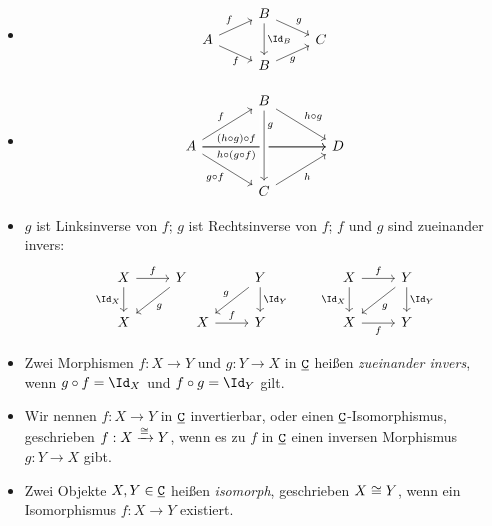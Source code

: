 \begin{ex}
	\begin{itemize}
		\item
			\[
				\begin{tikzcd}[row sep=tiny]
					& B \arrow{dr}{g} \arrow{dd}{\Id_B} & \\
					A \arrow{ur}{f} \arrow{dr}[below]{f} & & C \\
					& B \arrow{ur}[below]{g} &
				\end{tikzcd}
			\]
		\item
			\[
				\begin{tikzcd}[column sep=large]
					~& B \arrow{dr}{h\circ g} & \\
					A \arrow{ur}{f} \arrow{rr}[xshift=-7mm]{(h\circ g) \circ f}\arrow{rr}[xshift=-7mm,swap]{h\circ (g \circ f)} \arrow{dr}[swap]{g\circ f} & & D \\
					& C \arrow[leftarrow,crossing over]{uu}[yshift=5mm,swap]{g} \arrow{ur}[swap]{h} &
				\end{tikzcd}
			\]
		\item
			$g$ ist Linksinverse von $f$; $g$ ist Rechtsinverse von $f$; $f$ und $g$ sind zueinander invers:
			\[
				\begin{tikzcd}
					X \arrow{d}[swap]{\Id_X} \arrow{r}{f} & Y \arrow{dl}{g} \\
					X &
				\end{tikzcd}
				\!
				\begin{tikzcd}
					~& Y \arrow{d}{\Id_Y} \arrow{dl}[swap]{g} \\
					X \arrow{r}{f} & Y
				\end{tikzcd}
				\qquad
				\begin{tikzcd}
					X \arrow{r}{f} \arrow{d}[left]{\Id_X} & Y \arrow{d}{\Id_Y} \arrow{dl}{g} \\
					X \arrow{r}[below]{f} & Y
				\end{tikzcd}
			\]
	\end{itemize}
\end{ex}

\begin{df}
	\begin{itemize}
		\item
			Zwei Morphismen $f: X \to Y$ und $g: Y \to X$ in $\underline{\smash{\mathtt{C}}}$ heißen \emph{zueinander invers}, wenn $g \circ f = \Id_X$ und $f \circ g = \Id_Y$ gilt.
		\item
			Wir nennen $f: X \to Y$ in $\underline{\smash{\mathtt{C}}}$ invertierbar, oder einen $\underline{\smash{\mathtt{C}}}$-Isomorphismus, geschrieben $f: X \xrightarrow{\cong} Y$, wenn es zu $f$ in $\underline{\smash{\mathtt{C}}}$ einen inversen Morphismus $g: Y \to X$ gibt.
		\item
			Zwei Objekte $X, Y \in \underline{\smash{\mathtt{C}}}$ heißen \emph{isomorph}, geschrieben $X \cong Y$, wenn ein Isomorphismus $f: X \to Y$ existiert.
	\end{itemize}
\end{df}

